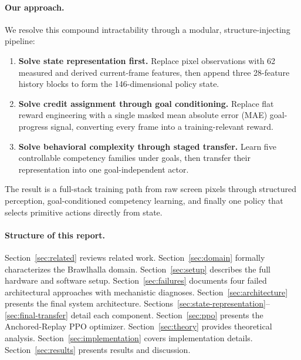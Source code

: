 \documentclass[11pt,a4paper]{article}
\begin{document}
\paragraph{Our approach.}
We resolve this compound intractability through a modular, structure-injecting pipeline:
\begin{enumerate}[leftmargin=1.5em]
    \item \textbf{Solve state representation first.} Replace pixel observations with 62 measured and derived current-frame features, then append three 28-feature history blocks to form the 146-dimensional policy state.
    \item \textbf{Solve credit assignment through goal conditioning.} Replace flat reward engineering with a single masked mean absolute error (MAE) goal-progress signal, converting every frame into a training-relevant reward.
    \item \textbf{Solve behavioral complexity through staged transfer.} Learn five controllable competency families under goals, then transfer their representation into one goal-independent actor.
\end{enumerate}

The result is a full-stack training path from raw screen pixels through structured perception, goal-conditioned competency learning, and finally one policy that selects primitive actions directly from state.

\paragraph{Structure of this report.}
Section~\ref{sec:related} reviews related work.
Section~\ref{sec:domain} formally characterizes the Brawlhalla domain.
Section~\ref{sec:setup} describes the full hardware and software setup.
Section~\ref{sec:failures} documents four failed architectural approaches with mechanistic diagnoses.
Section~\ref{sec:architecture} presents the final system architecture.
Sections~\ref{sec:state-representation}--\ref{sec:final-transfer} detail each component.
Section~\ref{sec:ppo} presents the Anchored-Replay PPO optimizer.
Section~\ref{sec:theory} provides theoretical analysis.
Section~\ref{sec:implementation} covers implementation details.
Section~\ref{sec:results} presents results and discussion.
\end{document}
